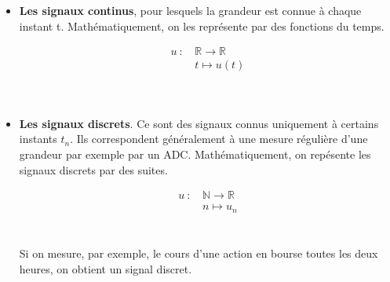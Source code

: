 \begin{itemize}
\item \textbf{Les signaux continus}, pour lesquels la grandeur est connue à chaque instant t. Mathématiquement, on les représente par des fonctions du temps. \\

\begin{minipage}{0.4\textwidth}
\begin{center}

\end{center}
\end{minipage}
\begin{minipage}{0.4\textwidth}
\begin{equation*}
	\begin{split}
		u~: \, & \mathbb{R} \rightarrow  \mathbb{R}  \\	
		& t \mapsto u(t) \\
	\end{split}
\end{equation*}
\end{minipage} \\

\item \textbf{Les signaux discrets}. Ce sont des signaux connus uniquement à certains instants $t_n$. Ils correspondent généralement à une mesure régulière d'une grandeur par exemple par un ADC. Mathématiquement, on repésente les signaux discrets par des suites. \\

\begin{minipage}{0.4\textwidth}
\begin{center}

\end{center}
\end{minipage}
\begin{minipage}{0.4\textwidth}
\begin{equation*}
	\begin{split}
		u~: \, & \mathbb{N} \rightarrow  \mathbb{R}  \\	
		& n \mapsto u_n \\
	\end{split}
\end{equation*}
\end{minipage} \\

Si on mesure, par exemple, le cours d'une action en bourse toutes les deux heures, on obtient un signal discret. \\

\end{itemize}

